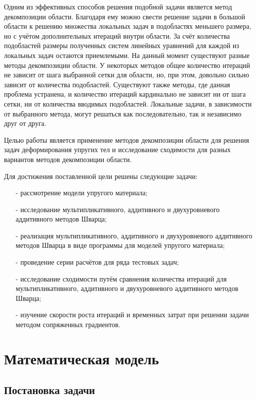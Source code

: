 \documentclass[a4paper, 14pt]{extarticle}
\begin{document}
Одним из эффективных способов решения подобной задачи является метод декомпозиции области. Благодаря ему можно свести решение задачи в большой области к решению множества локальных задач в подобластях меньшего размера, но с учётом дополнительных итераций внутри области. За счёт количества подобластей размеры полученных систем линейных уравнений для каждой из локальных задач остаются приемлемыми. На данный момент существуют разные методы декомпозиции области. У некоторых методов общее количество итераций не зависит от шага выбранной сетки для области, но, при этом, довольно сильно зависит от количества подобластей. Существуют также методы, где данная проблема устранена, и количество итераций кардинально не зависит ни от шага сетки, ни от количества вводимых подобластей. Локальные задачи, в зависимости от выбранного метода, могут решаться как последовательно, так и независимо друг от друга.

Целью работы является применение методов декомпозиции области для решения задач деформирования упругих тел и исследование сходимости для разных вариантов методов декомпозиции области.

Для достижения поставленной цели решены следующие задачи:
\begin{itemize}
\item[-]рассмотрение модели упругого материала;
\item[-]исследование мультипликативного, аддитивного и двухуровневого аддитивного методов Шварца;
\item[-]реализация мультипликативного, аддитивного и двухуровневого аддитивного методов Шварца в виде программы для моделей упругого материала;
\item[-]проведение серии расчётов для ряда тестовых задач;
\item[-]исследование сходимости путём сравнения количества итераций для мультипликативного, аддитивного и двухуровневого аддитивного методов Шварца;
\item[-]изучение скорости роста итераций и временных затрат при решении задачи методом сопряженных градиентов.
\end{itemize}

\newpage
 
\section{Математическая модель}

\subsection{Постановка задачи}
\end{document}
